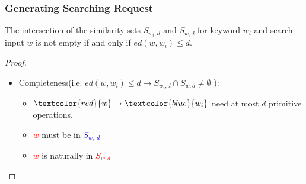 \documentclass{beamer}
\begin{document}
\begin{frame}
	\frametitle{Generating Searching Request}
	\begin{theorem}
		The intersection of the similarity sets ${S_{{w_i},d}}$ and ${S_{w,d}}$ for keyword $w_i$ and  search input $w$ is not empty if and only if $ed(w,{w_i}) \le d$.
	\end{theorem}
	
	\begin{proof}
		\begin{itemize}
			\item Completeness(i.e. $ed(w,{w_i}) \le d \to {S_{{w_i},d}} \cap {S_{w,d}} \ne \emptyset $ ):
			\begin{itemize}
				\item $\textcolor{red}{w} \to \textcolor{blue}{{w_i}}$ need at most $d$ primitive operations.
				\item \textcolor{red}{$w$} must be in \textcolor{blue}{${S_{{w_i},d}}$} 
				\item \textcolor{red}{$w$} is naturally in \textcolor{red}{${S_{w,d}}$}
			\end{itemize}
		\end{itemize}
	\end{proof}
\end{frame}
\end{document}
